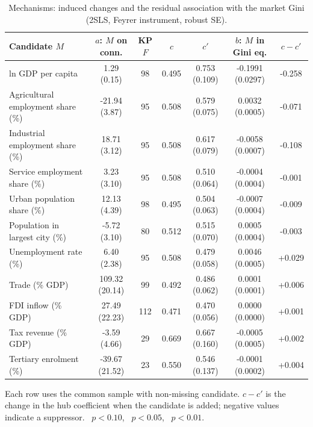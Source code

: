 \begin{table}[H]\centering\caption{Mechanisms: induced changes and the residual association with the market Gini (2SLS, Feyrer instrument, robust SE).}\label{tab:mech}
\begin{threeparttable}\small\begin{tabular}{lcccccc}
\toprule
Candidate $M$ & $a$: $M$ on conn. & KP $F$ & $c$ & $c'$ & $b$: $M$ in Gini eq. & $c-c'$ \\
\midrule
ln GDP per capita & 1.29\sym{***} (0.15) & 98 & 0.495 & 0.753\sym{***} (0.109) & -0.1991\sym{***} (0.0297) & -0.258 \\
Agricultural employment share (\%) & -21.94\sym{***} (3.87) & 95 & 0.508 & 0.579\sym{***} (0.075) & 0.0032\sym{***} (0.0005) & -0.071 \\
Industrial employment share (\%) & 18.71\sym{***} (3.12) & 95 & 0.508 & 0.617\sym{***} (0.079) & -0.0058\sym{***} (0.0007) & -0.108 \\
Service employment share (\%) & 3.23 (3.10) & 95 & 0.508 & 0.510\sym{***} (0.064) & -0.0004 (0.0004) & -0.001 \\
Urban population share (\%) & 12.13\sym{***} (4.39) & 98 & 0.495 & 0.504\sym{***} (0.063) & -0.0007\sym{**} (0.0004) & -0.009 \\
Population in largest city (\%) & -5.72\sym{*} (3.10) & 80 & 0.512 & 0.515\sym{***} (0.070) & 0.0005 (0.0004) & -0.003 \\
Unemployment rate (\%) & 6.40\sym{***} (2.38) & 95 & 0.508 & 0.479\sym{***} (0.058) & 0.0046\sym{***} (0.0005) & +0.029 \\
Trade (\% GDP) & 109.32\sym{***} (20.14) & 99 & 0.492 & 0.486\sym{***} (0.062) & 0.0001 (0.0001) & +0.006 \\
FDI inflow (\% GDP) & 27.49 (22.23) & 112 & 0.471 & 0.470\sym{***} (0.056) & 0.0000 (0.0000) & +0.001 \\
Tax revenue (\% GDP) & -3.59 (4.66) & 29 & 0.669 & 0.667\sym{***} (0.160) & -0.0005 (0.0005) & +0.002 \\
Tertiary enrolment (\%) & -39.67\sym{*} (21.52) & 23 & 0.550 & 0.546\sym{***} (0.137) & -0.0001 (0.0002) & +0.004 \\
\bottomrule
\end{tabular}
\begin{tablenotes}\footnotesize\item Each row uses the common sample with non-missing candidate. $c-c'$ is the change in the hub coefficient when the candidate is added; negative values indicate a suppressor. \sym{*}~$p<0.10$, \sym{**}~$p<0.05$, \sym{***}~$p<0.01$.\end{tablenotes}\end{threeparttable}\end{table}

